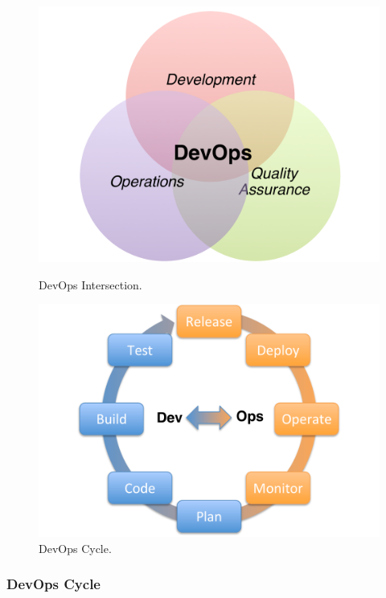 \begin{figure}[htb]
  \centering
   \begin{minipage}{.5\textwidth}
    \includegraphics[width=1.0\textwidth]{images/devops.pdf}
    \caption{DevOps Intersection.}
    \label{F:devops}
  \end{minipage}%
   \begin{minipage}{.5\textwidth}
     \includegraphics[width=1.0\textwidth]{images/devops-circle.pdf}
     \caption{DevOps Cycle.}
     \label{F:devops-circel}
  \end{minipage}%
\end{figure}

\subsubsection{DevOps Cycle}

